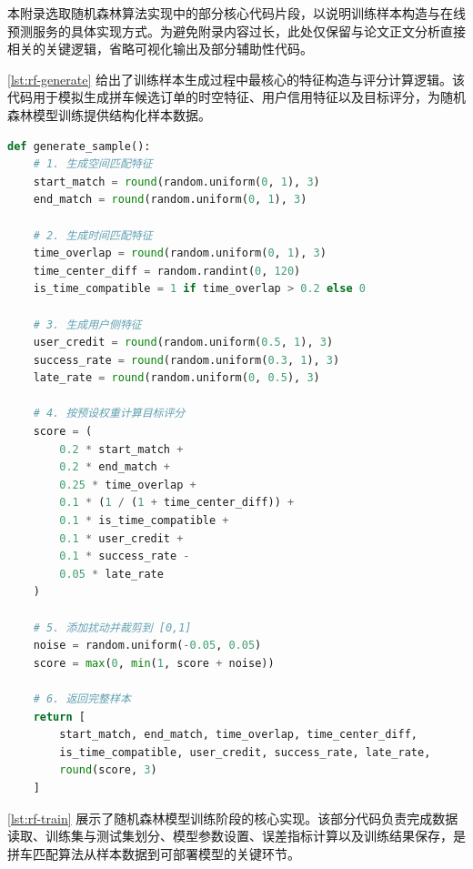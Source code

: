 \label{sec:appendix-code}

本附录选取随机森林算法实现中的部分核心代码片段，以说明训练样本构造与在线预测服务的具体实现方式。为避免附录内容过长，此处仅保留与论文正文分析直接相关的关键逻辑，省略可视化输出及部分辅助性代码。


\cref{lst:rf-generate} 给出了训练样本生成过程中最核心的特征构造与评分计算逻辑。该代码用于模拟生成拼车候选订单的时空特征、用户信用特征以及目标评分，为随机森林模型训练提供结构化样本数据。

\begin{lstlisting}[language=Python,caption={随机森林训练样本生成核心代码},label={lst:rf-generate}]
def generate_sample():
    # 1. 生成空间匹配特征
    start_match = round(random.uniform(0, 1), 3)
    end_match = round(random.uniform(0, 1), 3)

    # 2. 生成时间匹配特征
    time_overlap = round(random.uniform(0, 1), 3)
    time_center_diff = random.randint(0, 120)
    is_time_compatible = 1 if time_overlap > 0.2 else 0

    # 3. 生成用户侧特征
    user_credit = round(random.uniform(0.5, 1), 3)
    success_rate = round(random.uniform(0.3, 1), 3)
    late_rate = round(random.uniform(0, 0.5), 3)

    # 4. 按预设权重计算目标评分
    score = (
        0.2 * start_match +
        0.2 * end_match +
        0.25 * time_overlap +
        0.1 * (1 / (1 + time_center_diff)) +
        0.1 * is_time_compatible +
        0.1 * user_credit +
        0.1 * success_rate -
        0.05 * late_rate
    )

    # 5. 添加扰动并裁剪到 [0,1]
    noise = random.uniform(-0.05, 0.05)
    score = max(0, min(1, score + noise))

    # 6. 返回完整样本
    return [
        start_match, end_match, time_overlap, time_center_diff,
        is_time_compatible, user_credit, success_rate, late_rate,
        round(score, 3)
    ]
\end{lstlisting}


\cref{lst:rf-train} 展示了随机森林模型训练阶段的核心实现。该部分代码负责完成数据读取、训练集与测试集划分、模型参数设置、误差指标计算以及训练结果保存，是拼车匹配算法从样本数据到可部署模型的关键环节。

